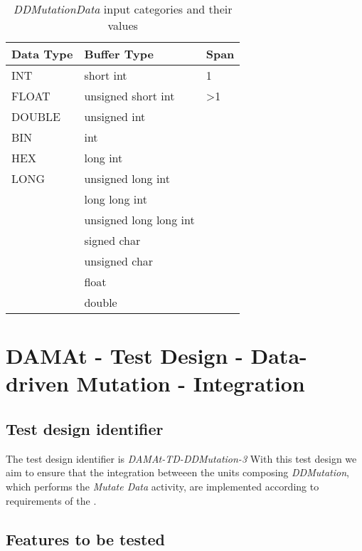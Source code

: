 \begin{table}[h]
  \scriptsize
  \centering
  \caption{\emph{DDMutationData} input categories and their values}
  \label{table:ddmutation2_categories}
\begin{tabular}{@{}lll@{}}
\toprule
\textbf{Data Type} & \textbf{Buffer Type}   & \textbf{Span}   \\ \midrule
INT                & short int              & 1               \\
FLOAT              & unsigned short int     & \textgreater{}1 \\
DOUBLE             & unsigned int           &                 \\
BIN                & int                    &                 \\
HEX                & long int               &                 \\
LONG               & unsigned long int      &                 \\
                   & long long int          &                 \\
                   & unsigned long long int &                 \\
                   & signed char            &                 \\
                   & unsigned char          &                 \\
                   & float                  &                 \\
                   & double                 &                 \\ \bottomrule
\end{tabular}
\end{table}


\section{DAMAt - Test Design - Data-driven Mutation - Integration}

\subsection{Test design identifier}
%
The test design identifier is \emph{DAMAt-TD-DDMutation-3}
%
With this test design we aim to ensure that the integration betweeen the units composing \emph{DDMutation}, which performs the \emph{Mutate Data} activity, are implemented according to requirements of the \FAQAS.
%
\subsection{Features to be tested}

